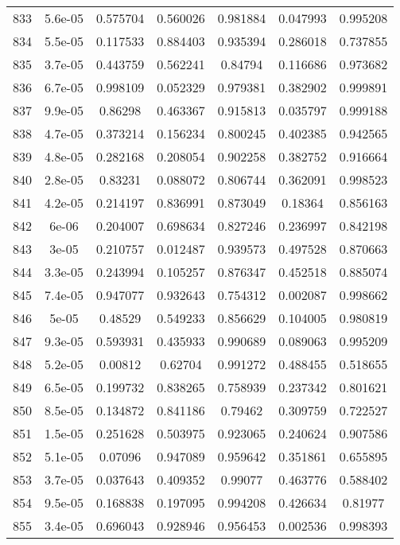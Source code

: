 \begin{table}
\begin{tabular}{c|c|c|c|c|c|c}
833 & 5.6e-05 & 0.575704 & 0.560026 & 0.981884 & 0.047993 & 0.995208\\
834 & 5.5e-05 & 0.117533 & 0.884403 & 0.935394 & 0.286018 & 0.737855\\
835 & 3.7e-05 & 0.443759 & 0.562241 & 0.84794 & 0.116686 & 0.973682\\
836 & 6.7e-05 & 0.998109 & 0.052329 & 0.979381 & 0.382902 & 0.999891\\
837 & 9.9e-05 & 0.86298 & 0.463367 & 0.915813 & 0.035797 & 0.999188\\
838 & 4.7e-05 & 0.373214 & 0.156234 & 0.800245 & 0.402385 & 0.942565\\
839 & 4.8e-05 & 0.282168 & 0.208054 & 0.902258 & 0.382752 & 0.916664\\
840 & 2.8e-05 & 0.83231 & 0.088072 & 0.806744 & 0.362091 & 0.998523\\
841 & 4.2e-05 & 0.214197 & 0.836991 & 0.873049 & 0.18364 & 0.856163\\
842 & 6e-06 & 0.204007 & 0.698634 & 0.827246 & 0.236997 & 0.842198\\
843 & 3e-05 & 0.210757 & 0.012487 & 0.939573 & 0.497528 & 0.870663\\
844 & 3.3e-05 & 0.243994 & 0.105257 & 0.876347 & 0.452518 & 0.885074\\
845 & 7.4e-05 & 0.947077 & 0.932643 & 0.754312 & 0.002087 & 0.998662\\
846 & 5e-05 & 0.48529 & 0.549233 & 0.856629 & 0.104005 & 0.980819\\
847 & 9.3e-05 & 0.593931 & 0.435933 & 0.990689 & 0.089063 & 0.995209\\
848 & 5.2e-05 & 0.00812 & 0.62704 & 0.991272 & 0.488455 & 0.518655\\
849 & 6.5e-05 & 0.199732 & 0.838265 & 0.758939 & 0.237342 & 0.801621\\
850 & 8.5e-05 & 0.134872 & 0.841186 & 0.79462 & 0.309759 & 0.722527\\
851 & 1.5e-05 & 0.251628 & 0.503975 & 0.923065 & 0.240624 & 0.907586\\
852 & 5.1e-05 & 0.07096 & 0.947089 & 0.959642 & 0.351861 & 0.655895\\
853 & 3.7e-05 & 0.037643 & 0.409352 & 0.99077 & 0.463776 & 0.588402\\
854 & 9.5e-05 & 0.168838 & 0.197095 & 0.994208 & 0.426634 & 0.81977\\
855 & 3.4e-05 & 0.696043 & 0.928946 & 0.956453 & 0.002536 & 0.998393\\
\end{tabular}
\end{table}
